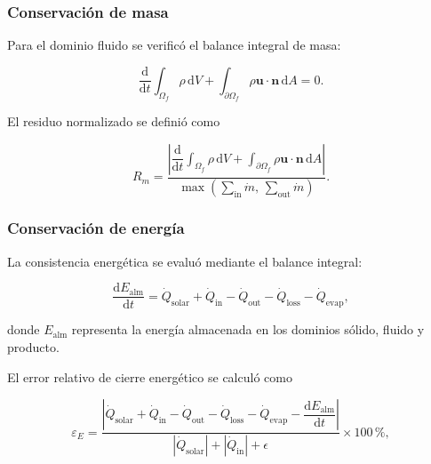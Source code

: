 \subsubsection{Conservación de masa}
\label{subsubsec:conservacion_masa}

Para el dominio fluido se verificó el balance integral de masa:

\begin{equation}
\frac{\mathrm{d}}{\mathrm{d}t}
\int_{\Omega_f}
\rho\,\mathrm{d}V
+
\int_{\partial\Omega_f}
\rho\mathbf{u}\cdot\mathbf{n}\,\mathrm{d}A
=
0.
\label{eq:balance_integral_masa}
\end{equation}

El residuo normalizado se definió como

\begin{equation}
R_m
=
\frac{
\left|
\dfrac{\mathrm{d}}{\mathrm{d}t}
\int_{\Omega_f}\rho\,\mathrm{d}V
+
\int_{\partial\Omega_f}
\rho\mathbf{u}\cdot\mathbf{n}\,\mathrm{d}A
\right|
}{
\max\left(
\displaystyle
\sum_{\mathrm{in}}\dot m,\,
\sum_{\mathrm{out}}\dot m
\right)
}.
\label{eq:residuo_masa}
\end{equation}

\subsubsection{Conservación de energía}
\label{subsubsec:conservacion_energia}

La consistencia energética se evaluó mediante el balance integral:

\begin{equation}
\frac{\mathrm{d}E_{\mathrm{alm}}}{\mathrm{d}t}
=
\dot Q_{\mathrm{solar}}
+
\dot Q_{\mathrm{in}}
-
\dot Q_{\mathrm{out}}
-
\dot Q_{\mathrm{loss}}
-
\dot Q_{\mathrm{evap}},
\label{eq:balance_integral_energia_validacion}
\end{equation}

donde $E_{\mathrm{alm}}$ representa la energía almacenada en los dominios sólido, fluido y producto.

El error relativo de cierre energético se calculó como

\begin{equation}
\varepsilon_E
=
\frac{
\left|
\dot Q_{\mathrm{solar}}
+
\dot Q_{\mathrm{in}}
-
\dot Q_{\mathrm{out}}
-
\dot Q_{\mathrm{loss}}
-
\dot Q_{\mathrm{evap}}
-
\dfrac{\mathrm{d}E_{\mathrm{alm}}}{\mathrm{d}t}
\right|
}{
\left|
\dot Q_{\mathrm{solar}}
\right|
+
\left|
\dot Q_{\mathrm{in}}
\right|
+
\epsilon
}
\times 100\,\%,
\label{eq:error_cierre_energia}
\end{equation}

